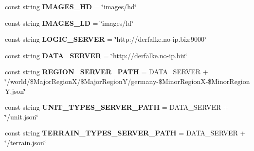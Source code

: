\begin{DoxyCompactItemize}
\item 
\hypertarget{classClient_1_1Common_1_1Helper_1_1ClientConstants_aa1a5b1c5317bc476a4357e1d8e769df5}{const string {\bfseries I\-M\-A\-G\-E\-S\-\_\-\-H\-D} = \char`\"{}images/hd\char`\"{}}\label{classClient_1_1Common_1_1Helper_1_1ClientConstants_aa1a5b1c5317bc476a4357e1d8e769df5}

\item 
\hypertarget{classClient_1_1Common_1_1Helper_1_1ClientConstants_ac08b4c199c1811502d8a4fb6e7c110c4}{const string {\bfseries I\-M\-A\-G\-E\-S\-\_\-\-L\-D} = \char`\"{}images/ld\char`\"{}}\label{classClient_1_1Common_1_1Helper_1_1ClientConstants_ac08b4c199c1811502d8a4fb6e7c110c4}

\item 
\hypertarget{classClient_1_1Common_1_1Helper_1_1ClientConstants_af933c866a55d35d67506082c502b176e}{const string {\bfseries L\-O\-G\-I\-C\-\_\-\-S\-E\-R\-V\-E\-R} = \char`\"{}http\-://derfalke.\-no-\/ip.\-biz\-:9000\char`\"{}}\label{classClient_1_1Common_1_1Helper_1_1ClientConstants_af933c866a55d35d67506082c502b176e}

\item 
\hypertarget{classClient_1_1Common_1_1Helper_1_1ClientConstants_a7c994023c157ac2c31b9b5c67ee15f6f}{const string {\bfseries D\-A\-T\-A\-\_\-\-S\-E\-R\-V\-E\-R} = \char`\"{}http\-://derfalke.\-no-\/ip.\-biz\char`\"{}}\label{classClient_1_1Common_1_1Helper_1_1ClientConstants_a7c994023c157ac2c31b9b5c67ee15f6f}

\item 
\hypertarget{classClient_1_1Common_1_1Helper_1_1ClientConstants_aa74dab28e1bd4c782ce69c777bf11b18}{const string {\bfseries R\-E\-G\-I\-O\-N\-\_\-\-S\-E\-R\-V\-E\-R\-\_\-\-P\-A\-T\-H} = D\-A\-T\-A\-\_\-\-S\-E\-R\-V\-E\-R + \char`\"{}/world/\$Major\-Region\-X/\$Major\-Region\-Y/germany-\/\$Minor\-Region\-X-\/\$Minor\-Region\-Y.\-json\char`\"{}}\label{classClient_1_1Common_1_1Helper_1_1ClientConstants_aa74dab28e1bd4c782ce69c777bf11b18}

\item 
\hypertarget{classClient_1_1Common_1_1Helper_1_1ClientConstants_a9cf3c4ead310b5fd6e58c18f0e09d175}{const string {\bfseries U\-N\-I\-T\-\_\-\-T\-Y\-P\-E\-S\-\_\-\-S\-E\-R\-V\-E\-R\-\_\-\-P\-A\-T\-H} = D\-A\-T\-A\-\_\-\-S\-E\-R\-V\-E\-R + \char`\"{}/unit.\-json\char`\"{}}\label{classClient_1_1Common_1_1Helper_1_1ClientConstants_a9cf3c4ead310b5fd6e58c18f0e09d175}

\item 
\hypertarget{classClient_1_1Common_1_1Helper_1_1ClientConstants_a2d74341dc9307aaa6a6601442898ec07}{const string {\bfseries T\-E\-R\-R\-A\-I\-N\-\_\-\-T\-Y\-P\-E\-S\-\_\-\-S\-E\-R\-V\-E\-R\-\_\-\-P\-A\-T\-H} = D\-A\-T\-A\-\_\-\-S\-E\-R\-V\-E\-R + \char`\"{}/terrain.\-json\char`\"{}}\label{classClient_1_1Common_1_1Helper_1_1ClientConstants_a2d74341dc9307aaa6a6601442898ec07}


\end{DoxyCompactItemize}
